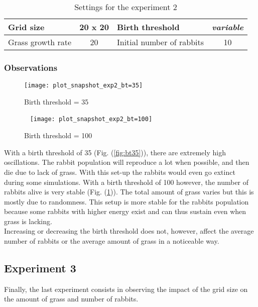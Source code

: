 \documentclass[11pt]{article}
\begin{document}
\begin{table}[H]
\centering
\begin{tabular}{|l|c||l|c|}
\hline
Grid size         & 20 x 20 & Birth threshold           & \textit{variable}  \\ \hline
Grass growth rate & 20      & Initial number of rabbits & 10                 \\ \hline
\end{tabular}
\caption{Settings for the experiment 2}
\end{table}

\subsubsection{Observations}

\begin{figure}[H]
	\centering
	\begin{minipage}{0.49\linewidth}
    	\centering
    	\texttt{[image: plot\_snapshot\_exp2\_bt=35]}
    	\caption{Birth threshold = 35}
        \label{fig:bt35}
	\end{minipage}
    	\begin{minipage}{0.49\linewidth}
    	\centering~
    	\texttt{[image: plot\_snapshot\_exp2\_bt=100]}
    	\caption{Birth threshold = 100}
        \label{fig:bt100}
	\end{minipage}
\end{figure}

With a birth threshold of 35 (Fig. (\ref{fig:bt35})), there are extremely high oscillations. The rabbit population will reproduce a lot when possible, and then die due to lack of grass. With this set-up the rabbits would even go extinct during some simulations. With a birth threshold of 100 however, the number of rabbits alive is very stable (Fig. (\ref{fig:bt100})). The total amount of grass varies but this is mostly due to randomness. This setup is more stable for the rabbits population because some rabbits with higher energy exist and can thus sustain even when grass is lacking.\\

Increasing or decreasing the birth threshold does not, however, affect the average number of rabbits or the average amount of grass in a noticeable way.


\subsection{Experiment 3}
Finally, the last experiment consists in observing the impact of the grid size on the amount of grass and number of rabbits.
\end{document}
